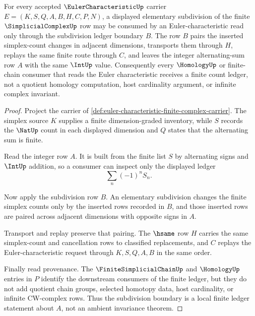 \begin{theorem}
\label{thm:euler-characteristic-subdivision-ledger-boundary}
For every accepted $\EulerCharacteristicUp$ carrier $E=(K,S,Q,A,B,H,C,P,N)$, a displayed elementary subdivision of the finite $\SimplicialComplexUp$ row may be consumed by an Euler-characteristic read only through the subdivision ledger boundary $B$. The row $B$ pairs the inserted simplex-count changes in adjacent dimensions, transports them through $H$, replays the same finite route through $C$, and leaves the integer alternating-sum row $A$ with the same $\IntUp$ value. Consequently every $\HomologyUp$ or finite-chain consumer that reads the Euler characteristic receives a finite count ledger, not a quotient homology computation, host cardinality argument, or infinite complex invariant.
\end{theorem}
\begin{proof}
Project the carrier of \autoref{def:euler-characteristic-finite-complex-carrier}. The simplex source $K$ supplies a finite dimension-graded inventory, while $S$ records the $\NatUp$ count in each displayed dimension and $Q$ states that the alternating sum is finite.

Read the integer row $A$. It is built from the finite list $S$ by alternating signs and $\IntUp$ addition, so a consumer can inspect only the displayed ledger
$$
\sum_n (-1)^n S_n .
$$

Now apply the subdivision row $B$. An elementary subdivision changes the finite simplex counts only by the inserted rows recorded in $B$, and those inserted rows are paired across adjacent dimensions with opposite signs in $A$.

Transport and replay preserve that pairing. The $\hsame$ row $H$ carries the same simplex-count and cancellation rows to classified replacements, and $C$ replays the Euler-characteristic request through $K,S,Q,A,B$ in the same order.

Finally read provenance. The $\FiniteSimplicialChainUp$ and $\HomologyUp$ entries in $P$ identify the downstream consumers of the finite ledger, but they do not add quotient chain groups, selected homotopy data, host cardinality, or infinite CW-complex rows. Thus the subdivision boundary is a local finite ledger statement about $A$, not an ambient invariance theorem.
\end{proof}



